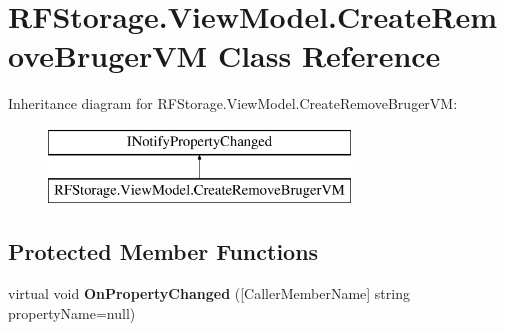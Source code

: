 \hypertarget{class_r_f_storage_1_1_view_model_1_1_create_remove_bruger_v_m}{}\section{R\+F\+Storage.\+View\+Model.\+Create\+Remove\+Bruger\+VM Class Reference}
\label{class_r_f_storage_1_1_view_model_1_1_create_remove_bruger_v_m}
Inheritance diagram for R\+F\+Storage.\+View\+Model.\+Create\+Remove\+Bruger\+VM\+:\begin{figure}[H]
\begin{center}
\leavevmode
\includegraphics[height=2.000000cm]{class_r_f_storage_1_1_view_model_1_1_create_remove_bruger_v_m}
\end{center}
\end{figure}
\subsection*{Protected Member Functions}
\begin{DoxyCompactItemize}
\item 
\mbox{\label{class_r_f_storage_1_1_view_model_1_1_create_remove_bruger_v_m_aed26d4464dbae553e8eefe8bd874aef6}} 
virtual void {\bfseries On\+Property\+Changed} (\mbox{[}Caller\+Member\+Name\mbox{]} string property\+Name=null)
\end{DoxyCompactItemize}
